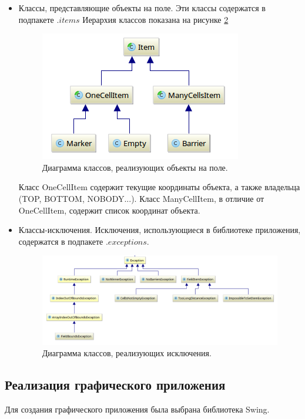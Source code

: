\documentclass[a4paper]{article}
\begin{document}
\begin{itemize}
\item Классы, представляющие объекты на поле. Эти классы содержатся в подпакете $.items$ Иерархия классов показана на рисунке \ref{pic:classDiagram} 
\begin{figure}[H]
	\begin{center}
		\includegraphics[scale=0.5]{classDiagram}
		\caption{Диаграмма классов, реализующих объекты на поле.} 
		\label{pic:classDiagram} %
	\end{center}
\end{figure}
Класс OneCellItem содержит текущие координаты объекта, а также владельца (TOP, BOTTOM, NOBODY...). Класс ManyCellItem, в отличие от OneCellItem, содержит список координат объекта. 

\item Классы-исключения. Исключения, использующиеся в библиотеке приложения, содержатся в подпакете $.exceptions$. 
\begin{figure}[H]
	\begin{center}
		\includegraphics[scale=0.4]{exceptions}
		\caption{Диаграмма классов, реализующих исключения.} 
		\label{pic:classDiagram} %
	\end{center}
\end{figure}

\end{itemize}

\subsection{Реализация графического приложения}
Для создания графического приложения была выбрана библиотека Swing. \\
\end{document}
